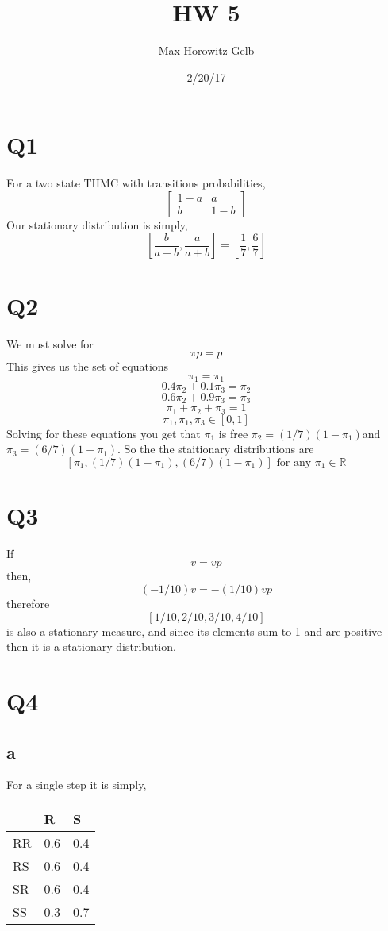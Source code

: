 \documentclass{article}
\title{HW 5}
\author{Max Horowitz-Gelb}
\date{2/20/17}
\begin{document}
\maketitle
\section*{Q1}
For a two state THMC with transitions probabilities,
\[
\begin{bmatrix}
1-a & a\\
b & 1-b
\end{bmatrix}
\]
Our stationary distribution is simply,
\[
[\frac{b}{a+b}, \frac{a}{a+b}] = [\frac{1}{7}, \frac{6}{7}]
\]

\section*{Q2}
We must solve for
\[
\pi p = p
\]
This gives us the set of equations
\[
\pi_1 = \pi_1
\]
\[
0.4\pi_2 + 0.1\pi_3 = \pi_2
\]
\[
0.6\pi_2 + 0.9\pi_3 = \pi_3
\]
\[
\pi_1 + \pi_2 + \pi_3 = 1
\]
\[
\pi_1, \pi_1, \pi_3 \in [0,1]
\]
Solving for these equations you get that $\pi_1$ is free $\pi_2 = (1/7)(1-\pi_1) $and $\pi_3 = (6/7)(1-\pi_1)$.
So the the staitionary distributions are
\[
[\pi_1, (1/7)(1-\pi_1), (6/7)(1-\pi_1)]  \text{ for any } \pi_1 \in \mathbb{R}
\] 

\section*{Q3}
If
\[
v = vp
\]
then,
\[
(-1/10)v = -(1/10)vp
\]
therefore
\[
[1/10,2/10,3/10,4/10]
\]
is also a stationary measure, and since its elements sum to 1 and are positive then it is a stationary distribution.



\section*{Q4}

\subsection*{a}
For a single step it is simply,
\begin{tabular}{|l|l|l}
\hline
 & R & S \\ \hline
RR & 0.6 & 0.4\\ \hline
RS & 0.6 & 0.4\\ \hline
SR & 0.6 & 0.4\\ \hline
SS & 0.3 & 0.7 \\ \hline
\end{tabular}
\end{document}
